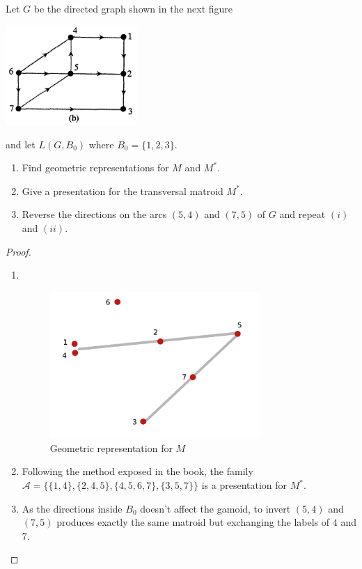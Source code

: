 \prob
{
    Let $G$ be the directed graph shown in the next figure 
		    \begin{center}
                \includegraphics[width=5cm]{Test2/Problem13/Figure2_17.png}
            \end{center}\pn
		and let $L(G, B_0)$ where $B_0 = \{1,2,3\}$. 
    \begin{enumerate}[label=(\roman*)]
        \item   Find geometric representations for $M$ and $M^*$.
        \item   Give a presentation for the transversal matroid $M^*$.
        \item   Reverse the directions on the arcs $(5,4)$ and $(7,5)$ of $G$
                and repeat $(i)$ and $(ii)$.
    \end{enumerate}
}
\begin{proof}
    \begin{enumerate}[label=(\roman*)]
        \item $\,$\pn
                 \begin{figure}[H]
                    \begin{center}
                        \includegraphics[width=8cm]{Test2/Problem13/GraphicRepresentationM.png}
                    \end{center}                            
                    \caption{Geometric representation for $M$}
                    \label{t2:p13_GraphicRepresentationM.png}                        
                \end{figure}\pn    
                
        \item  Following the method exposed in the book, the family $\mathcal{A} = \{\{1, 4\}, \{2, 4, 5\}, \{4, 5, 6, 7\}, \{3, 5, 7\}\}$
                is a presentation for $M^*$.
                
        \item As the directions inside $B_0$ doesn't affect the gamoid, to invert $(5,4)$ and $(7,5)$
                produces exactly the same matroid but exchanging the labels of $4$ and $7$.\pn
    \end{enumerate}
\end{proof}